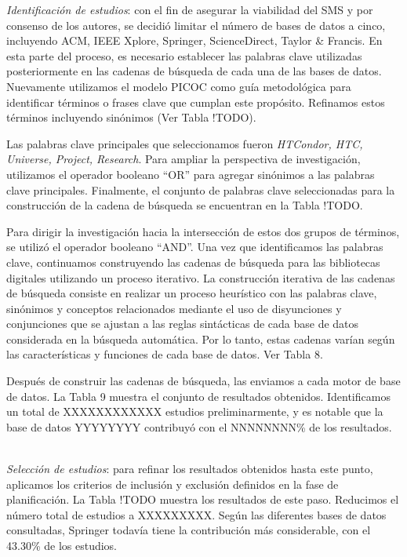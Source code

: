 \textit{Identificación de estudios}: con el fin de asegurar la viabilidad del SMS y por consenso de los autores, se decidió limitar el número de bases de datos a cinco, incluyendo ACM, IEEE Xplore, Springer, ScienceDirect, Taylor \& Francis. En esta parte del proceso, es necesario establecer las palabras clave utilizadas posteriormente en las cadenas de búsqueda de cada una de las bases de datos. Nuevamente utilizamos el modelo PICOC como guía metodológica para identificar términos o frases clave que cumplan este propósito. Refinamos estos términos incluyendo sinónimos (Ver Tabla !TODO).

Las palabras clave principales que seleccionamos fueron \textit{HTCondor, HTC, Universe, Project, Research}. Para ampliar la perspectiva de investigación, utilizamos el operador booleano ``OR'' para agregar sinónimos a las palabras clave principales.
Finalmente, el conjunto de palabras clave seleccionadas para la construcción de la cadena de búsqueda se encuentran en la Tabla !TODO.

Para dirigir la investigación hacia la intersección de estos dos grupos de términos, se utilizó el operador booleano ``AND''. Una vez que identificamos las palabras clave, continuamos construyendo las cadenas de búsqueda para las bibliotecas digitales utilizando un proceso iterativo. La construcción iterativa de las cadenas de búsqueda consiste en realizar un proceso heurístico con las palabras clave, sinónimos y conceptos relacionados mediante el uso de disyunciones y conjunciones que se ajustan a las reglas sintácticas de cada base de datos considerada en la búsqueda automática. Por lo tanto, estas cadenas varían según las características y funciones de cada base de datos. Ver Tabla 8.

Después de construir las cadenas de búsqueda, las enviamos a cada motor de base de datos. La Tabla 9 muestra el conjunto de resultados obtenidos. Identificamos un total de XXXXXXXXXXXX estudios preliminarmente, y es notable que la base de datos  YYYYYYYY contribuyó con el NNNNNNNN\% de los resultados.

\mbox{}\\


\textit{Selección de estudios}: para refinar los resultados obtenidos hasta este punto, aplicamos los criterios de inclusión y exclusión definidos en la fase de planificación. La Tabla !TODO muestra los resultados de este paso. Reducimos el número total de estudios a XXXXXXXXX. Según las diferentes bases de datos consultadas, Springer todavía tiene la contribución más considerable, con el 43.30\% de los estudios.

